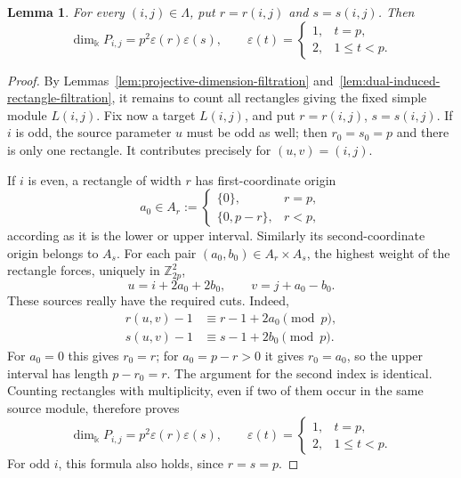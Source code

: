 \documentclass[10pt,oneside]{amsart}
\newcommand{\kk}{\Bbbk}
\newcommand{\Z}{\mathbb Z}
\newtheorem{lemma}[proposition]{Lemma}
\theoremstyle{definition}
\begin{document}
\begin{lemma}\label{lem:projective-dimension-formula}
For every $(i,j)\in\Lambda$, put $r=r(i,j)$ and $s=s(i,j)$.
Then
\[
 \dim_{\kk}P_{i,j}=p^2\varepsilon(r)\varepsilon(s),\qquad
 \varepsilon(t)=
 \begin{cases}
 1,&t=p,\\
 2,&1\le t<p.
 \end{cases}
\]
\end{lemma}
\begin{proof}
By Lemmas~\ref{lem:projective-dimension-filtration}
and~\ref{lem:dual-induced-rectangle-filtration}, it remains to
count all rectangles giving the fixed simple module $L(i,j)$.
Fix now a target $L(i,j)$, and put $r=r(i,j)$, $s=s(i,j)$.
If $i$ is odd, the source parameter $u$ must be odd as well;
then $r_0=s_0=p$ and there is only one rectangle. It contributes
precisely for $(u,v)=(i,j)$.

If $i$ is even, a rectangle of width $r$ has first-coordinate
origin
\[
 a_0\in A_r:=
 \begin{cases}
 \{0\},&r=p,\\
 \{0,p-r\},&r<p,
 \end{cases}
\]
according as it is the lower or upper interval. Similarly its
second-coordinate origin belongs to $A_s$. For each pair
$(a_0,b_0)\in A_r\times A_s$, the highest weight of the rectangle
forces, uniquely in $\Z_{2p}^2$,
\[
 u=i+2a_0+2b_0,\qquad v=j+a_0-b_0.
\]
These sources really have the required cuts. Indeed,
\[
\begin{aligned}
 r(u,v)-1&\equiv r-1+2a_0\pmod p,\\
 s(u,v)-1&\equiv s-1+2b_0\pmod p.
\end{aligned}
\]
For $a_0=0$ this gives $r_0=r$; for $a_0=p-r>0$ it gives
$r_0=a_0$, so the upper interval has length $p-r_0=r$.
The argument for the second index is identical. Counting
rectangles with multiplicity, even if two of them occur in the
same source module, therefore proves
\begin{equation}\label{eq:projective-dimension-explicit}
 \dim_{\kk}P_{i,j}=p^2\varepsilon(r)\varepsilon(s),
 \qquad
 \varepsilon(t)=
 \begin{cases}
 1,&t=p,\\
 2,&1\le t<p.
 \end{cases}
\end{equation}
For odd $i$, this formula also holds, since $r=s=p$.

\end{proof}
\end{document}
